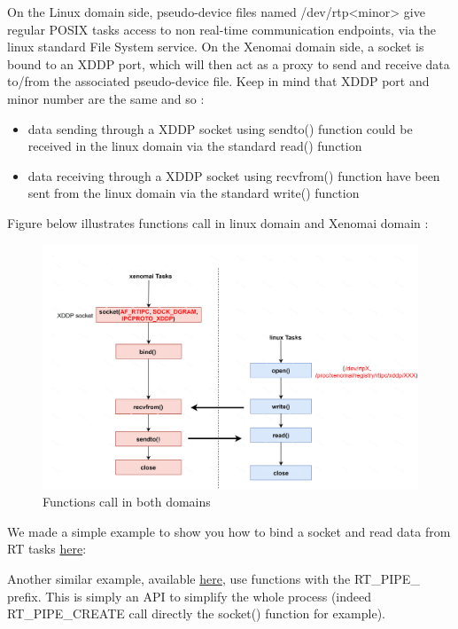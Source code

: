 \documentclass[12pt,hidelinks]{article}
\begin{document}
{	On the Linux domain side, pseudo-device files named /dev/rtp<minor> give regular POSIX tasks access to non real-time communication endpoints, via the linux standard File System service. 
	\newline On the Xenomai domain side, a socket is bound to an XDDP port, which will then act as a proxy to send and receive data to/from the associated pseudo-device file. Keep in mind that XDDP port and minor number are the same and so :
 
 \begin{itemize}
     \item data sending through a XDDP socket using sendto() function could be received in the linux domain via the standard read() function
     \item data receiving through a XDDP socket using recvfrom() function have been sent from the linux domain via the standard write() function
 \end{itemize}
 
 Figure below illustrates functions call in linux domain and Xenomai domain :
 
     \begin{figure}[ht]
    \hspace{-2cm}
	\includegraphics[scale=0.2]{XDDPhowTo.png}
	\caption{Functions call in both domains}
	\end{figure} \newline
 
 We made a simple example to show you how to bind a socket and read data from RT tasks \href{https://github.com/skyultime/M2_ERTS_Project_xenomai_edh/tree/dev/SourceCode/xttpProtTemplate}{here}:  
 
 Another similar example, available \href{https://github.com/skyultime/M2_ERTS_Project_xenomai_edh/tree/dev/SourceCode/XenomaiSideXddpExample}{here}, use functions with the RT\_PIPE\_ prefix. This is simply an API to simplify the whole process (indeed RT\_PIPE\_CREATE call directly the socket() function for example).\newline
 
}
\end{document}
